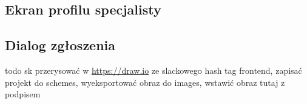 \documentclass[10pt, titlepage, oneside, a4paper]{article}
\begin{document}
	\subsection{Ekran profilu specjalisty}	
	\begin{figure}[!htbp]
  \begin{center}
  {%
		\setlength{\fboxsep}{0.5pt}%
		\setlength{\fboxrule}{0.5pt}%
	}%
  \end{center}
  \end{figure}
	\newpage
	
	\subsection{Dialog zgłoszenia}	
	todo sk przerysować w \url{https://draw.io} ze slackowego hash tag frontend, zapisać projekt do schemes, wyeksportować obraz do images, wstawić obraz tutaj z podpisem	
	\newpage	
	
\end{document}
